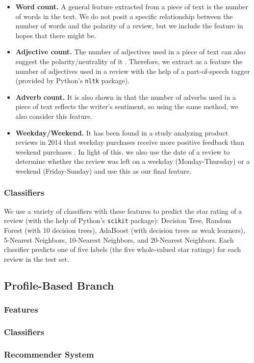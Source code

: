 \begin{itemize}
\item {\bf Word count.} A general feature extracted from a piece of text is the number of words in the text. We do not posit a specific relationship between the number of words and the polarity of a review, but we include the feature in hopes that there might be.

\item {\bf Adjective count.} The number of adjectives used in a piece of text can also suggest the polarity/neutrality of it \cite{adjectives}. Therefore, we extract as a feature the number of adjectives used in a review with the help of a part-of-speech tagger (provided by Python's \texttt{nltk} package).

\item {\bf Adverb count.} It is also shown in \cite{adjectives} that the number of adverbs used in a piece of text reflects the writer's sentiment, so using the same method, we also consider this feature.

\item {\bf Weekday/Weekend.} It has been found in a study analyzing product reviews in 2014 that weekday purchases receive more positive feedback than weekend purchases \cite{online-habit}. In light of this, we also use the date of a review to determine whether the review was left on a weekday (Monday-Thursday) or a weekend (Friday-Sunday) and use this as our final feature.

\end{itemize}

\subsubsection{Classifiers}
We use a variety of classifiers with these features to predict the star rating of a review (with the help of Python's \texttt{scikit} package): Decision Tree, Random Forest (with 10 decision trees), AdaBoost (with decision trees as weak learners), 5-Nearest Neighbors, 10-Nearest Neighbors, and 20-Nearest Neighbors. Each classifier predicts one of five labels (the five whole-valued star ratings) for each review in the test set.

\subsection{Profile-Based Branch}

\subsubsection{Features}

\subsubsection{Classifiers}

\subsubsection{Recommender System}
